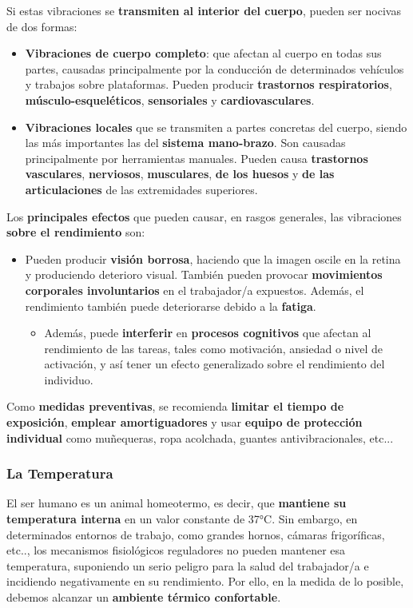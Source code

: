 Si estas vibraciones se \textbf{transmiten al interior del cuerpo}, pueden ser nocivas de dos formas:

\begin{itemize}
    \item \textbf{Vibraciones de cuerpo completo}: que afectan al cuerpo en todas sus partes, causadas principalmente por la conducción de determinados vehículos y trabajos sobre plataformas. Pueden producir \textbf{trastornos respiratorios}, \textbf{músculo-esqueléticos}, \textbf{sensoriales} y \textbf{cardiovasculares}.

    \item \textbf{Vibraciones locales} que se transmiten a partes concretas del cuerpo, siendo las más importantes las del \textbf{sistema mano-brazo}. Son causadas principalmente por herramientas manuales. Pueden causa \textbf{trastornos vasculares}, \textbf{nerviosos}, \textbf{musculares}, \textbf{de los huesos} y \textbf{de las articulaciones} de las extremidades superiores.
\end{itemize}

Los \textbf{principales efectos} que pueden causar, en rasgos generales, las vibraciones \textbf{sobre el rendimiento} son:

\begin{itemize}
    \item Pueden producir \textbf{visión borrosa}, haciendo que la imagen oscile en la retina y produciendo deterioro visual. También pueden provocar \textbf{movimientos corporales involuntarios} en el trabajador/a expuestos. Además, el rendimiento también puede deteriorarse debido a la \textbf{fatiga}.

    \begin{itemize}
        \item Además, puede \textbf{interferir} en \textbf{procesos cognitivos} que afectan al rendimiento de las tareas, tales como motivación, ansiedad o nivel de activación, y así tener un efecto generalizado sobre el rendimiento del individuo.
    \end{itemize}
\end{itemize}

Como \textbf{medidas preventivas}, se recomienda \textbf{limitar el tiempo de exposición}, \textbf{emplear amortiguadores} y usar \textbf{equipo de protección individual} como muñequeras, ropa acolchada, guantes antivibracionales, etc...

\subsubsection{La Temperatura}
El ser humano es un animal homeotermo, es decir, que \textbf{mantiene su temperatura interna} en un valor constante de 37°C. Sin embargo, en determinados entornos de trabajo, como grandes hornos, cámaras frigoríficas, etc.., los mecanismos fisiológicos reguladores no pueden mantener esa temperatura, suponiendo un serio peligro para la salud del trabajador/a  e incidiendo negativamente en su rendimiento. Por ello, en la medida de lo posible, debemos alcanzar un \textbf{ambiente térmico confortable}.

